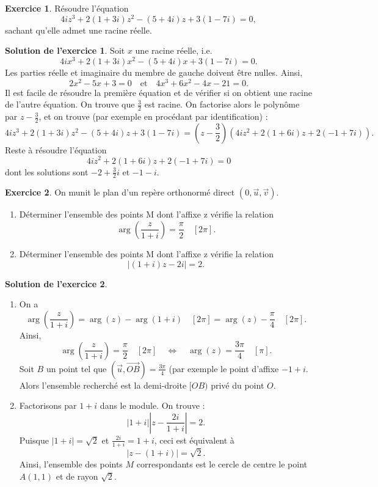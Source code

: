 \documentclass[a4paper, 11pt,openany]{article}%
\theoremstyle{plain}
\theoremstyle{definition}
\newtheorem{exo}{Exercice}
\newtheorem{sol}{Solution de l'exercice}
\theoremstyle{remark}
\begin{document}
\begin{exo}
Résoudre l'équation 
\[ 4iz^3+2(1+3i)z^2-(5+4i)z+3(1-7i)=0,\]
sachant qu'elle admet une racine réelle.
\end{exo}

\begin{sol}
Soit $x$ une racine réelle, i.e. 
\[ 4ix^3+2(1+3i)x^2-(5+4i)x+3(1-7i)=0.\]
Les parties réelle et imaginaire du membre de gauche doivent être nulles. Ainsi,
\[ 2x^2-5x+3=0 \quad \text{et} \quad 4x^3+6x^2-4x-21=0.\]
 Il est facile de résoudre la première équation et de vérifier si on obtient une racine de l'autre équation. On trouve que $\frac{3}{2}$ est racine. On factorise alors le polynôme par $z-\frac{3}{2}$, et on trouve (par exemple en procédant par identification) : 
 \[ 4iz^3+2(1+3i)z^2-(5+4i)z+3(1-7i)= \left( z- \frac{3}{2} \right) (4iz^2+2(1+6i)z+2(-1+7i)).\]
  Reste à résoudre l'équation 
  \[ 4iz^2+2(1+6i)z+2(-1+7i)=0\]
   dont les solutions sont $-2+\frac{3}{2}i$ et $-1-i$.
\end{sol}

\begin{exo}
On munit le plan d'un repère orthonormé direct $(0,\overrightarrow{u},\overrightarrow{v})$.
\begin{enumerate}
\item Déterminer l'ensemble des points M dont l'affixe z vérifie la relation
\[ \arg \left( \frac{z}{1+i} \right) = \frac{\pi}{2} \quad [2\pi].\]
\item Déterminer l'ensemble des points M dont l'affixe z vérifie la relation
\[ |(1+i)z - 2i| = 2.\]
\end{enumerate}
\end{exo}

\begin{sol}
\begin{enumerate}
\item On a 
\[ \arg \left( \frac{z}{1+i} \right) = \arg(z) - \arg(1+i) \quad [2\pi] = \arg(z) - \frac{\pi}{4} \quad [2\pi].\]
Ainsi,
\[ \arg \left( \frac{z}{1+i} \right) = \frac{\pi}{2} \quad [2\pi] \quad \Leftrightarrow \quad \arg(z) = \frac{3\pi}{4} \quad [\pi].\]
Soit $B$ un point tel que $(\overrightarrow{u},\overrightarrow{OB}) = \frac{3 \pi}{4}$ (par exemple le point d'affixe $-1 + i$. Alors l'ensemble recherché est la demi-droite $[OB)$ privé du point $O$.
\item Factorisons par $1+i$ dans le module. On trouve : 
\[ |1+i| \left| z- \frac{2i}{1+i} \right|=2.\]
Puisque $|1+i|=\sqrt{2}$ et $\frac{2i}{1+i} = 1+i$, ceci est équivalent à \[ |z-(1+i)| = \sqrt{2}.\]
Ainsi, l'ensemble des points $M$ correspondants est le cercle de centre le point $A(1,1)$ et de rayon $\sqrt{2}$. 
\end{enumerate}
\end{sol}
\end{document}
